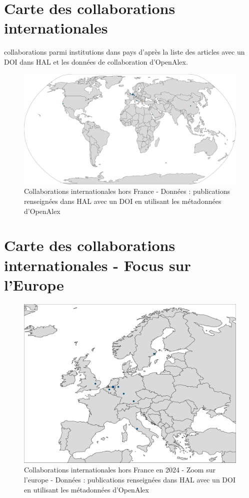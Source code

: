 \documentclass[french, 11pt]{../../dibiso/biso}
\begin{document}
\pagebreak

\section{Carte des collaborations internationales}

{\collaborationsnb} collaborations parmi {\institutionsnb} institutions dans {\countriesnb} pays d'après la liste des articles avec un DOI dans HAL et les données de collaboration d'OpenAlex.

\begin{figure}[!h]
  \hspace{-.1\textwidth}\includegraphics[width=1.2\textwidth]{figures/collaborations_map.pdf}
  \caption{Collaborations internationales hors France - Données : publications renseignées dans HAL avec un DOI en utilisant les métadonnées d'OpenAlex}
  \label{fig_collab_map}
\end{figure}

\pagebreak

\section{Carte des collaborations internationales - Focus sur l’Europe}

\begin{figure}[!h]
  \includegraphics[width=\textwidth]{figures/collaborations_map_europe.pdf}
  \caption{Collaborations internationales hors France en 2024 - Zoom sur l'europe - Données : publications renseignées dans HAL avec un DOI en utilisant les métadonnées d'OpenAlex}
  \label{fig_collab_map_europe}
\end{figure}
\end{document}
